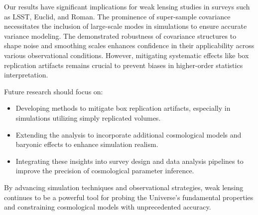 Our results have significant implications for weak lensing studies in surveys such as LSST, Euclid, and Roman. The prominence of super-sample covariance necessitates the inclusion of large-scale modes in simulations to ensure accurate variance modeling. The demonstrated robustness of covariance structures to shape noise and smoothing scales enhances confidence in their applicability across various observational conditions. However, mitigating systematic effects like box replication artifacts remains crucial to prevent biases in higher-order statistics interpretation.

Future research should focus on:
\begin{itemize}
    \item Developing methods to mitigate box replication artifacts, especially in simulations utilizing simply replicated volumes.
    \item Extending the analysis to incorporate additional cosmological models and baryonic effects to enhance simulation realism.
    \item Integrating these insights into survey design and data analysis pipelines to improve the precision of cosmological parameter inference.
\end{itemize}

By advancing simulation techniques and observational strategies, weak lensing continues to be a powerful tool for probing the Universe's fundamental properties and constraining cosmological models with unprecedented accuracy.